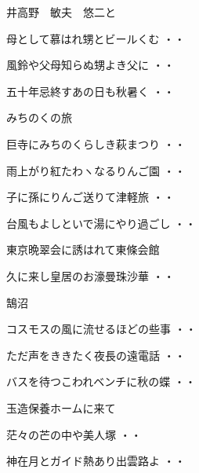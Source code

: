 \vspace{0.4cm}
井高野　敏夫　悠二と
\begin{shiika}母として慕はれ甥とビールくむ
\hfill{・・}\end{shiika}
\begin{shiika}風鈴や父母知らぬ甥よき父に
\hfill{・・}\end{shiika}
\begin{shiika}五十年忌終すあの日も秋暑く
\hfill{・・}\end{shiika}
\vspace{0.4cm}
みちのくの旅
\begin{shiika}巨寺にみちのくらしき萩まつり
\hfill{・・}\end{shiika}
\begin{shiika}雨上がり紅たわヽなるりんご園
\hfill{・・}\end{shiika}
\begin{shiika}子に孫にりんご送りて津軽旅
\hfill{・・}\end{shiika}
\begin{shiika}台風もよしといで湯にやり過ごし
\hfill{・・}\end{shiika}
\vspace{0.4cm}
東京晩翠会に誘はれて東條会館
\begin{shiika}久に来し皇居のお濠曼珠沙華
\hfill{・・}\end{shiika}
\vspace{0.4cm}
鵠沼
\begin{shiika}コスモスの風に流せるほどの些事
\hfill{・・}\end{shiika}
\begin{shiika}ただ声をききたく夜長の遠電話
\hfill{・・}\end{shiika}
\begin{shiika}バスを待つこわれベンチに秋の蝶
\hfill{・・}\end{shiika}
\vspace{0.4cm}
玉造保養ホームに来て
\begin{shiika}茫々の芒の中や美人塚
\hfill{・・}\end{shiika}
\begin{shiika}神在月とガイド熱あり出雲路よ
\hfill{・・}\end{shiika}
